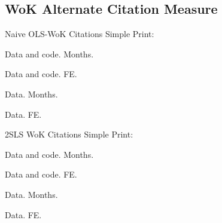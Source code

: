 \documentclass{beamer}
\begin{document}
\begin{frame}{}
\scalebox{0.6}{}
\end{frame}

\begin{frame}{}
\scalebox{0.6}{}
\end{frame}

\begin{frame}{}
\scalebox{0.6}{}
\end{frame}

\begin{frame}{}
\scalebox{0.6}{}
\end{frame}

\subsection{WoK Alternate Citation Measure}
\begin{frame}{Naive OLS-WoK Citations}
Simple Print:

Data and code. Months.

Data and code. FE.

Data. Months.

Data. FE.
\end{frame}

\begin{frame}{}
\scalebox{0.3}{}
\end{frame}

\begin{frame}{}
\scalebox{0.3}{}
\end{frame}

\begin{frame}{}
\scalebox{0.3}{}
\end{frame}

\begin{frame}{}
\scalebox{0.3}{}
\end{frame}

\begin{frame}{2SLS WoK Citations}
Simple Print:

Data and code. Months.

Data and code. FE.

Data. Months.

Data. FE.
\end{frame}
\end{document}
